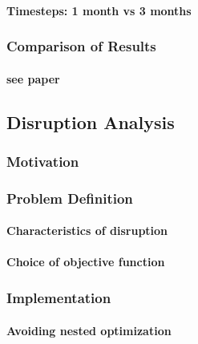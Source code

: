 \paragraph{Timesteps: 1 month vs 3 months}
\subsubsection{Comparison of Results}
\paragraph{see paper}
\subsection{Disruption Analysis}
\subsubsection{Motivation}
\subsubsection{Problem Definition}
\paragraph{Characteristics of disruption}
\paragraph{Choice of objective function}
\subsubsection{Implementation}
\paragraph{Avoiding nested optimization}
\paragraph{}
